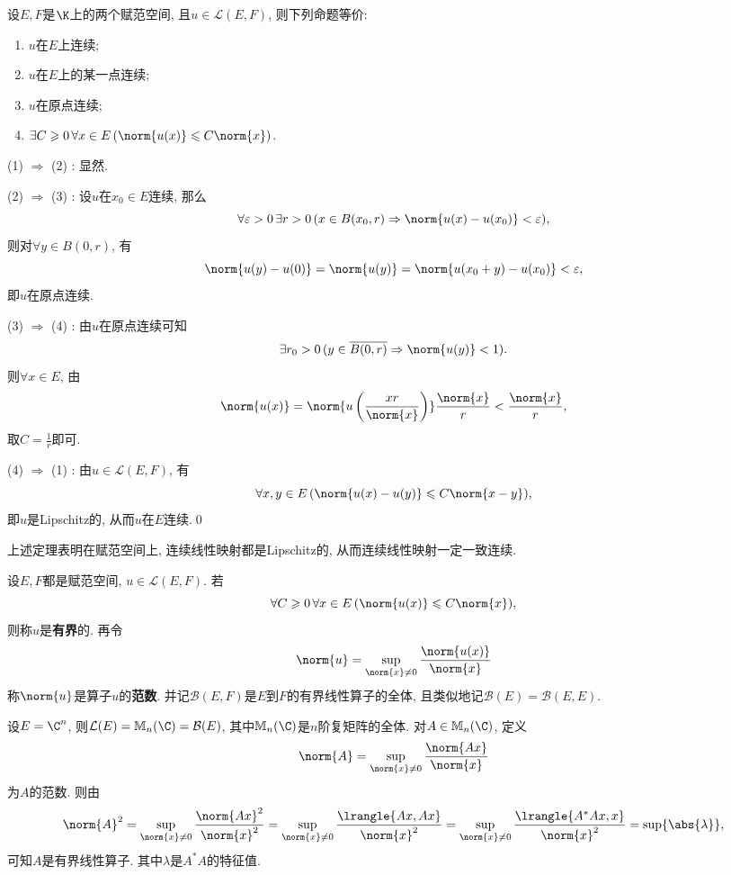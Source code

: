	\begin{Theorem}[连续性]\label{thm:线性算子连续性}
	设$ E, F $是$ \K $上的两个赋范空间, 且$ u\in\mathcal L(E,F) $, 则下列命题等价:
	\begin{enumerate}[(1)]
	\item $ u $在$ E $上连续;
	\item $ u $在$ E $上的某一点连续;
	\item $ u $在原点连续;
	\item $ \exists C\geqslant 0\,\forall x\in E\,(\norm{u(x)}\leqslant C\norm{x}) $.
	\end{enumerate}
	\end{Theorem}
	\begin{Proof}
	(1) $ \Rightarrow $ (2) : 显然.
	
	(2) $ \Rightarrow $ (3) : 设$ u $在$ x_0\in E $连续, 那么
	\[
	\forall\varepsilon>0\,\exists r>0\,(x\in B(x_0,r)\Rightarrow\norm{u(x)-u(x_0)}<\varepsilon),
	\]
	则对$ \forall y\in B(0,r) $, 有
	\[
	\norm{u(y)-u(0)}=\norm{u(y)}=\norm{u(x_0+y)-u(x_0)}<\varepsilon,
	\]
	即$ u $在原点连续.
	
	(3) $ \Rightarrow $ (4) : 由$ u $在原点连续可知
	\[
	\exists r_0>0\,(y\in\overline{B(0,r)}\Rightarrow\norm{u(y)}<1).
	\]
	则$ \forall x\in E $, 由
	\[
	\norm{u(x)}=\norm{u\left(\dfrac{xr}{\norm{x}}\right)}\frac{\norm{x}}{r}<\frac{\norm{x}}{r},
	\]
	取$ C=\frac{1}{r} $即可.
	
	(4) $ \Rightarrow $ (1) : 由$ u\in\mathcal{L}(E,F) $, 有
	\[
	\forall x,y\in E\,(\norm{u(x)-u(y)}\leqslant C\norm{x-y}),
	\]
	即$ u $是Lipschitz的, 从而$ u $在$ E $连续.\qed
	\end{Proof}
	
	\begin{Remark}
	上述定理表明在赋范空间上, 连续线性映射都是Lipschitz的, 从而连续线性映射一定一致连续.
	\end{Remark}
	
	\begin{Definition}[算子范数]
	设$ E,F $都是赋范空间, $ u\in\mathcal{L}(E,F) $. 若
	\[
	\forall C\geqslant 0\,\forall x\in E\,(\norm{u(x)}\leqslant C\norm{x}),
	\]
	则称$ u $是\textbf{有界}的. 再令
	\[
	\norm{u}=\sup_{\norm{x}\ne 0}\frac{\norm{u(x)}}{\norm{x}}
	\]
	称$ \norm{u} $是算子$ u $的\textbf{范数}. 并记$ \mathcal B(E,F) $是$ E $到$ F $的有界线性算子的全体, 且类似地记$ \mathcal{B}(E)=\mathcal{B}(E,E) $.
	\end{Definition}
	
	\begin{Example}
	设$ E=\C^n $, 则$ \mathcal{L}(E)=\mathbb{M}_n(\C)=\mathcal{B}(E) $, 其中$ \mathbb{M}_n(\C) $是$ n $阶复矩阵的全体. 对$ A\in\mathbb{M}_n(\C) $, 定义
	\[
	\norm{A}=\sup_{\norm{x}\ne 0}\frac{\norm{Ax}}{\norm{x}}
	\]
	为$ A $的范数. 则由
	\[
	\norm{A}^2=\sup_{\norm{x}\ne 0}\frac{\norm{Ax}^2}{\norm{x}^2}=\sup_{\norm{x}\ne 0}\frac{\lrangle{Ax,Ax}}{\norm{x}^2}=\sup_{\norm{x}\ne 0}\frac{\lrangle{A^\ast Ax,x}}{\norm{x}^2}=\sup\{\abs{\lambda}\},
	\]
	可知$ A $是有界线性算子. 其中$ \lambda $是$ A^\ast A $的特征值.
	\end{Example}
	
